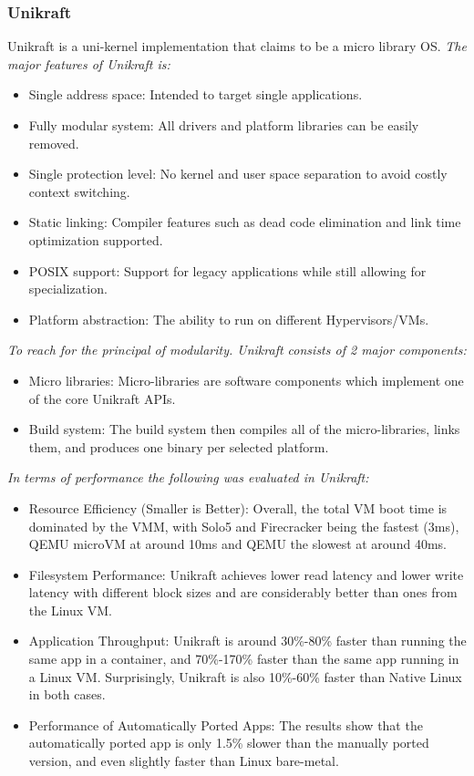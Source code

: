 \subsubsection{Unikraft}
Unikraft\cite{Unikraft} is a uni-kernel implementation that claims to be 
a micro library OS. \emph{The major features of Unikraft is:}
\begin{itemize}
  \item Single address space: Intended to target single applications.
  \item Fully modular system: All drivers and platform libraries can be easily removed.
  \item Single protection level: No kernel and user space separation to avoid costly context switching.
  \item Static linking: Compiler features such as dead code elimination and link time optimization supported. 
  \item POSIX support: Support for legacy applications while still allowing for specialization. 
  \item Platform abstraction: The ability to run on different Hypervisors/VMs. 
\end{itemize}
\emph{To reach for the principal of modularity. Unikraft consists of 2 major components:}
\begin{itemize}
  \item Micro libraries: Micro-libraries are software components 
  which implement one of the core Unikraft APIs.
  \item Build system: The build system
  then compiles all of the micro-libraries, links them,
  and produces one binary per selected platform.
\end{itemize}
\emph{In terms of performance the following was evaluated in Unikraft:}
\begin{itemize}
  \item Resource Efficiency (Smaller is Better): Overall, the total VM boot time is dominated by the VMM,
  with Solo5 and Firecracker being the fastest (3ms), QEMU
  microVM at around 10ms and QEMU the slowest at around
  40ms.
  \item Filesystem Performance: Unikraft
  achieves lower read latency and lower write latency with
  different block sizes and are considerably better than ones
  from the Linux VM.
  \item Application Throughput: Unikraft is around 30\%-80\% faster than running the same app
  in a container, and 70\%-170\% faster than the same app running 
  in a Linux VM. Surprisingly, Unikraft is also 10\%-60\%
  faster than Native Linux in both cases.
  \item Performance of Automatically Ported Apps: The results
  show that the automatically ported app is only 1.5\% slower
  than the manually ported version, and even slightly faster
  than Linux bare-metal.
\end{itemize}

